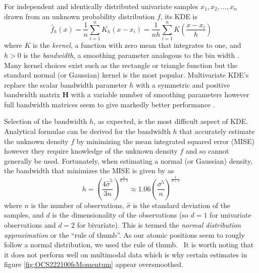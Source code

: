 For independent and identically distributed univariate samples $x_1, x_2, \dots, x_n$ drawn from an unknown probability distribution $f$, its KDE is
\begin{equation}
\hat{f}_h(x) = \frac{1}{n} \sum_{i=1}^n K_h(x-x_i)
= \frac{1}{nh} \sum_{i=1}^n K\left(\frac{x - x_i}{h}\right)
\end{equation}
where $K$ is the \emph{kernel}, a function with zero mean that integrates to one, and $h > 0$ is the \emph{bandwidth}, a smoothing parameter analogous to the bin width \citep[p. 137]{Scott15}. Many kernel choices exist such as the rectangle or triangle function but the standard normal (or Gaussian) kernel is the most popular. Multivariate KDE's replace the scalar bandwidth parameter $h$ with a symmetric and positive bandwidth matrix $\mathbf{H}$ with a variable number of smoothing parameters \citep{Wand93} however full bandwidth matrices seem to give markedly better performance \citep{Duong03}.

Selection of the bandwidth $h$, as expected, is the most difficult aspect of KDE. Analytical formulae can be derived for the bandwidth $h$ \citep[p. 143]{Scott15} that accurately estimate the unknown density $f$ by minimizing the mean integrated squared error (MISE) however they require knowledge of the unknown density $f$ and so cannot generally be used. Fortunately, when estimating a normal (or Gaussian) density, the bandwidth that minimizes the MISE is given by \citet{Silverman86} as
\begin{equation}
  h = \left(\frac{4\hat{\sigma}^5}{3n} \right)^\frac{1}{d+4}
    \approx 1.06 \left(\frac{\sigma^5}{n} \right)^\frac{1}{d+4}
\end{equation}
where $n$ is the number of observations, $\hat{\sigma}$ is the standard deviation of the samples, and $d$ is the dimensionality of the observations (so $d=1$ for univariate observations and $d=2$ for bivariate). This is termed the \emph{normal distribution approximation} or the ``rule of thumb''. As our atomic positions seem to rougly follow a normal distribution, we used the \citet{Silverman86} rule of thumb.\footnotemark~ It is worth noting that it does not perform well on multimodal data which is why certain estimates in figure \ref{fig:OCS222100fsMomentum} appear oversmoothed.


